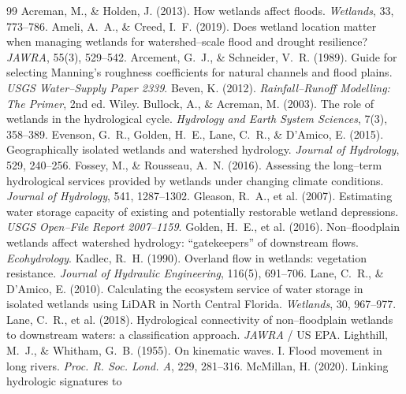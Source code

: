 \documentclass[11pt]{article}
\begin{document}
\begin{thebibliography}{99}\small
{} Acreman, M., \& Holden, J. (2013). How wetlands
affect floods. \emph{Wetlands}, 33, 773--786.
 Ameli, A.~A., \& Creed, I.~F. (2019). Does wetland
location matter when managing wetlands for watershed--scale flood and drought resilience?
\emph{JAWRA}, 55(3), 529--542.
 Arcement, G.~J., \& Schneider, V.~R. (1989).
Guide for selecting Manning's roughness coefficients for natural channels and flood plains.
\emph{USGS Water--Supply Paper 2339}.
 Beven, K. (2012). \emph{Rainfall--Runoff Modelling: The Primer},
2nd ed. Wiley.
 Bullock, A., \& Acreman, M. (2003). The role of
wetlands in the hydrological cycle. \emph{Hydrology and Earth System Sciences}, 7(3), 358--389.
 Evenson, G.~R., Golden, H.~E., Lane, C.~R., \&
D'Amico, E. (2015). Geographically isolated wetlands and watershed hydrology. \emph{Journal of
Hydrology}, 529, 240--256.
 Fossey, M., \& Rousseau, A.~N. (2016). Assessing
the long--term hydrological services provided by wetlands under changing climate conditions.
\emph{Journal of Hydrology}, 541, 1287--1302.
 Gleason, R.~A., et al. (2007). Estimating water storage
capacity of existing and potentially restorable wetland depressions. \emph{USGS Open--File
Report 2007--1159}.
 Golden, H.~E., et al. (2016). Non--floodplain wetlands
affect watershed hydrology: ``gatekeepers'' of downstream flows. \emph{Ecohydrology}.
 Kadlec, R.~H. (1990). Overland flow in wetlands: vegetation
resistance. \emph{Journal of Hydraulic Engineering}, 116(5), 691--706.
 Lane, C.~R., \& D'Amico, E. (2010). Calculating
the ecosystem service of water storage in isolated wetlands using LiDAR in North Central Florida.
\emph{Wetlands}, 30, 967--977.
 Lane, C.~R., et al. (2018). Hydrological connectivity of
non--floodplain wetlands to downstream waters: a classification approach. \emph{JAWRA} / US EPA.
 Lighthill, M.~J., \& Whitham, G.~B. (1955).
On kinematic waves. I. Flood movement in long rivers. \emph{Proc. R. Soc. Lond. A}, 229, 281--316.
 McMillan, H. (2020). Linking hydrologic signatures to

\end{thebibliography}
\end{document}
